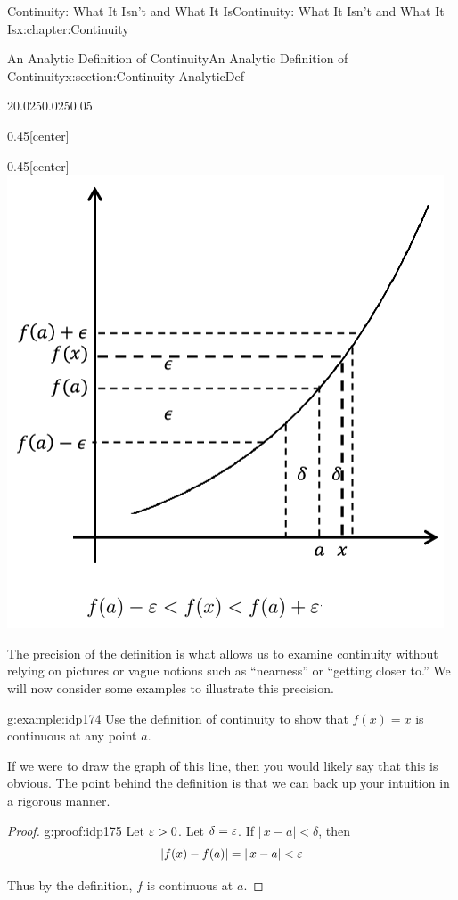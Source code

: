 \begin{chapterptx}{Continuity: What It Isn't and What It Is}{}{Continuity: What It Isn't and What It Is}{}{}{x:chapter:Continuity}
\begin{sectionptx}{An Analytic Definition of Continuity}{}{An Analytic Definition of Continuity}{}{}{x:section:Continuity-AnalyticDef}
\begin{sidebyside}{2}{0.025}{0.025}{0.05}
\begin{sbspanel}{0.45}[center]
			\end{sbspanel}%
			\begin{sbspanel}{0.45}[center]%
				\includegraphics[width=\linewidth]{external/images/Ch5fig3d.png}
			\end{sbspanel}%
		\end{sidebyside}%
		The precision of the definition is what allows us to examine continuity without relying on pictures or vague notions such as ``nearness'' or ``getting closer to.'' We will now consider some examples to illustrate this precision.%
		\begin{example}{}{g:example:idp174}%
			Use the definition of continuity to show that \(f(x)=x\) is continuous at any point \(a\).%
		\end{example}
		If we were to draw the graph of this line, then you would likely say that this is obvious.  The point behind the definition is that we can back up your intuition in a rigorous manner.%
		\begin{proof}{}{g:proof:idp175}
			Let \(\varepsilon>0\). Let \(\delta=\varepsilon\). If \(|\,x-a|\lt \delta\), then%
			\begin{equation*}
				|f(x)-f(a)|=|\,x-a|< \varepsilon
			\end{equation*}
			\par
			Thus by the definition, \(f\) is continuous at \(a\).%

\end{proof}
\end{sectionptx}
\end{chapterptx}
